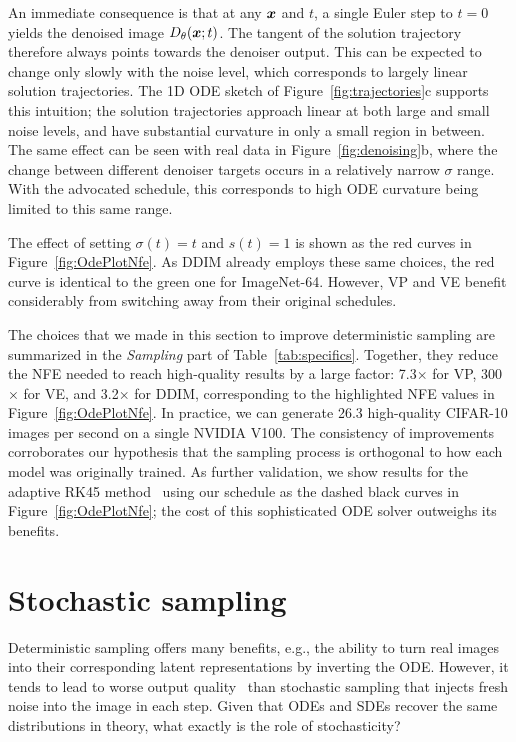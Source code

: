 \documentclass{article}
\newif\ifemail
\begin{document}
An immediate consequence is that at any $\boldsymbol{x}$ and $t$, a single Euler step to $t=0$ yields the denoised image $D_\theta(\boldsymbol{x}; t)$.
The tangent of the solution trajectory therefore always points towards the denoiser output.
This can be expected to change only slowly with the noise level, which corresponds to largely linear solution trajectories.
The 1D ODE sketch of Figure~\ref{fig:trajectories}c supports this intuition; the solution trajectories approach linear at both large and small noise levels, and have substantial curvature in only a small region in between.
The same effect can be seen with real data in Figure~\ref{fig:denoising}b, where the change between different denoiser targets occurs in a relatively narrow $\sigma$ range.
With the advocated schedule, this corresponds to high ODE curvature being limited to this same range.

The effect of setting $\sigma(t)=t$ and $s(t)=1$ is shown as the red curves in Figure~\ref{fig:OdePlotNfe}.
As DDIM already employs these same choices, the red curve is identical to the green one for ImageNet-64.
However, VP and VE benefit considerably from switching away from their original schedules.

\ifemail
\else
  \figTrajectories
\fi

The choices that we made in this section to improve deterministic sampling are summarized in the \emph{Sampling} part of Table~\ref{tab:specifics}.
Together, they reduce the NFE needed to reach high-quality results by a large factor: 7.3$\times$ for VP, 300$\times$ for VE, and 3.2$\times$ for DDIM, corresponding to the highlighted NFE values in Figure~\ref{fig:OdePlotNfe}.
In practice, we can generate 26.3 high-quality CIFAR-10 images per second on a single NVIDIA V100. %
The consistency of improvements corroborates our hypothesis that the sampling process is orthogonal to how each model was originally trained.
As further validation, 
we show results for the adaptive RK45 method~\cite{Dormand1980} using our schedule as the dashed black curves in Figure~\ref{fig:OdePlotNfe}; the cost of this sophisticated ODE solver outweighs its benefits.

\section{Stochastic sampling}
\label{sec:stochasticity}

Deterministic sampling offers many benefits, e.g., the ability to turn real images into their corresponding latent representations by inverting the ODE.
However, it tends to lead to worse output quality~\cite{Song2020ddim,Song2021sde} than stochastic sampling that injects fresh noise into the image in each step.
Given that ODEs and SDEs recover the same distributions in theory, what exactly is the role of stochasticity?
\end{document}

